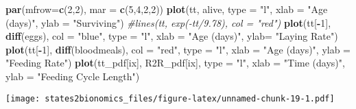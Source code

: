\documentclass[]{article}
\newenvironment{Shaded}{\begin{snugshade}}{\end{snugshade}}
\newcommand{\CommentTok}[1]{\textcolor[rgb]{0.56,0.35,0.01}{\textit{#1}}}
\newcommand{\DataTypeTok}[1]{\textcolor[rgb]{0.13,0.29,0.53}{#1}}
\newcommand{\DecValTok}[1]{\textcolor[rgb]{0.00,0.00,0.81}{#1}}
\newcommand{\KeywordTok}[1]{\textcolor[rgb]{0.13,0.29,0.53}{\textbf{#1}}}
\newcommand{\NormalTok}[1]{#1}
\newcommand{\OperatorTok}[1]{\textcolor[rgb]{0.81,0.36,0.00}{\textbf{#1}}}
\newcommand{\StringTok}[1]{\textcolor[rgb]{0.31,0.60,0.02}{#1}}
\begin{document}
\begin{Shaded}
\begin{Highlighting}[]
\KeywordTok{par}\NormalTok{(}\DataTypeTok{mfrow=}\KeywordTok{c}\NormalTok{(}\DecValTok{2}\NormalTok{,}\DecValTok{2}\NormalTok{), }\DataTypeTok{mar =} \KeywordTok{c}\NormalTok{(}\DecValTok{5}\NormalTok{,}\DecValTok{4}\NormalTok{,}\DecValTok{2}\NormalTok{,}\DecValTok{2}\NormalTok{))}
\KeywordTok{plot}\NormalTok{(tt, alive, }\DataTypeTok{type =} \StringTok{"l"}\NormalTok{, }\DataTypeTok{xlab =} \StringTok{"Age (days)"}\NormalTok{, }\DataTypeTok{ylab =} \StringTok{"Surviving"}\NormalTok{)}
\CommentTok{#lines(tt, exp(-tt/9.78), col = "red")}
\KeywordTok{plot}\NormalTok{(tt[}\OperatorTok{-}\DecValTok{1}\NormalTok{], }\KeywordTok{diff}\NormalTok{(eggs), }\DataTypeTok{col =} \StringTok{"blue"}\NormalTok{, }\DataTypeTok{type =} \StringTok{"l"}\NormalTok{, }\DataTypeTok{xlab =} \StringTok{"Age (days)"}\NormalTok{, }\DataTypeTok{ylab=} \StringTok{"Laying Rate"}\NormalTok{)}
\KeywordTok{plot}\NormalTok{(tt[}\OperatorTok{-}\DecValTok{1}\NormalTok{], }\KeywordTok{diff}\NormalTok{(bloodmeals), }\DataTypeTok{col =} \StringTok{"red"}\NormalTok{, }\DataTypeTok{type =} \StringTok{"l"}\NormalTok{, }\DataTypeTok{xlab =} \StringTok{"Age (days)"}\NormalTok{, }\DataTypeTok{ylab =} \StringTok{"Feeding Rate"}\NormalTok{)}
\KeywordTok{plot}\NormalTok{(tt_pdf[ix], R2R_pdf[ix], }\DataTypeTok{type =} \StringTok{"l"}\NormalTok{, }\DataTypeTok{xlab =} \StringTok{"Time (days)"}\NormalTok{, }\DataTypeTok{ylab =} \StringTok{"Feeding Cycle Length"}\NormalTok{)}
\end{Highlighting}
\end{Shaded}

\texttt{[image: states2bionomics\_files/figure-latex/unnamed-chunk-19-1.pdf]}
\end{document}
